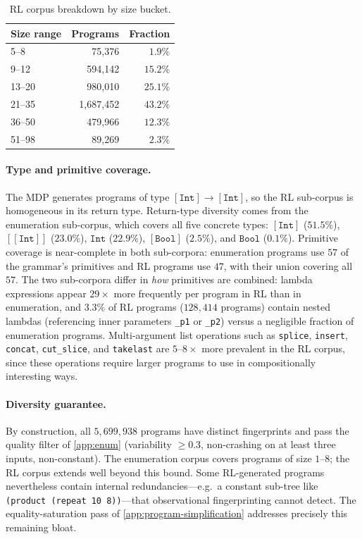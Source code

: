 \documentclass[12pt]{article}
\begin{document}
\begin{table}[!htbp]
\centering
\caption{RL corpus breakdown by size bucket.}
\label{tab:rl-buckets}
\begin{tabular}{lrr}
\toprule
Size range & Programs & Fraction \\
\midrule
5--8   &     75{,}376 &  $1.9\%$ \\
9--12  &    594{,}142 & $15.2\%$ \\
13--20 &    980{,}010 & $25.1\%$ \\
21--35 &  1{,}687{,}452 & $43.2\%$ \\
36--50 &    479{,}966 & $12.3\%$ \\
51--98 &     89{,}269 &  $2.3\%$ \\
\bottomrule
\end{tabular}
\end{table}

\paragraph{Type and primitive coverage.} The MDP generates programs of type $[\texttt{Int}] \to [\texttt{Int}]$, so the RL sub-corpus is homogeneous in its return type. Return-type diversity comes from the enumeration sub-corpus, which covers all five concrete types: $[\texttt{Int}]$ ($51.5\%$), $[[\texttt{Int}]]$ ($23.0\%$), $\texttt{Int}$ ($22.9\%$), $[\texttt{Bool}]$ ($2.5\%$), and $\texttt{Bool}$ ($0.1\%$). Primitive coverage is near-complete in both sub-corpora: enumeration programs use $57$ of the grammar's primitives and RL programs use $47$, with their union covering all $57$. The two sub-corpora differ in \emph{how} primitives are combined: lambda expressions appear $29\times$ more frequently per program in RL than in enumeration, and $3.3\%$ of RL programs ($128{,}414$ programs) contain nested lambdas (referencing inner parameters \texttt{\_p1} or \texttt{\_p2}) versus a negligible fraction of enumeration programs. Multi-argument list operations such as \texttt{splice}, \texttt{insert}, \texttt{concat}, \texttt{cut\_slice}, and \texttt{takelast} are $5$--$8\times$ more prevalent in the RL corpus, since these operations require larger programs to use in compositionally interesting ways.

\paragraph{Diversity guarantee.} By construction, all $5{,}699{,}938$ programs have distinct fingerprints and pass the quality filter of \cref{app:enum} (variability $\geq 0.3$, non-crashing on at least three inputs, non-constant). The enumeration corpus covers programs of size $1$--$8$; the RL corpus extends well beyond this bound. Some RL-generated programs nevertheless contain internal redundancies---e.g.\ a constant sub-tree like \texttt{(product (repeat 10 8))}---that observational fingerprinting cannot detect. The equality-saturation pass of \cref{app:program-simplification} addresses precisely this remaining bloat.
\end{document}
